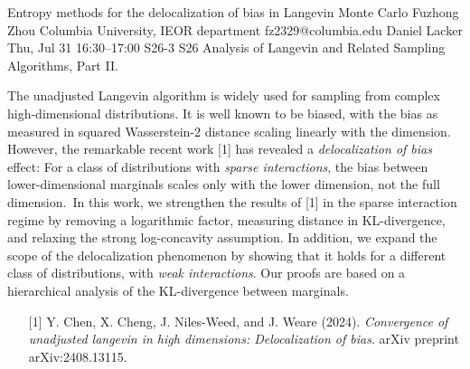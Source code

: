 \begin{talk}
  {Entropy methods for the delocalization of bias in Langevin Monte Carlo}%
  {Fuzhong Zhou}%
  {Columbia University, IEOR department}%
  {fz2329@columbia.edu}%
  {Daniel Lacker}%
  {}%
  {Thu, Jul 31 16:30–17:00}%
  {S26-3}%
  {S26}%
  {Analysis of
  	Langevin and Related Sampling Algorithms, Part II.}%
				
			
The unadjusted Langevin algorithm is widely used for sampling from complex high-dimensional distributions. It is well known to be biased, with the bias as measured in squared Wasserstein-2 distance scaling linearly with the dimension. However, the remarkable recent work [1] has revealed a \textit{delocalization of bias} effect: For a class of distributions with \textit{sparse interactions}, the bias between lower-dimensional marginals scales only with the lower dimension, not the full dimension. In this work, we strengthen the results of [1] in the sparse interaction regime by removing a logarithmic factor, measuring distance in KL-divergence, and relaxing the strong log-concavity assumption. In addition, we expand the scope of the delocalization phenomenon by showing that it holds for a different class of distributions, with \textit{weak interactions}. Our proofs are based on a hierarchical analysis of the KL-divergence between marginals.



\medskip



\begin{enumerate}
	\item[{[1]}] Y. Chen, X. Cheng, J. Niles-Weed, and J. Weare (2024). {\it Convergence of unadjusted langevin in high dimensions: Delocalization of bias}. arXiv preprint arXiv:2408.13115.
\end{enumerate}


\end{talk}

